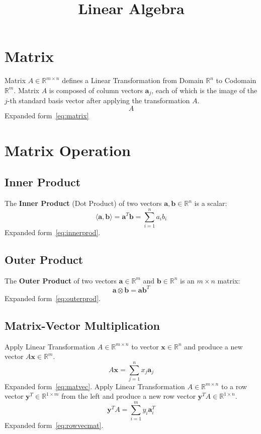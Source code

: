 \documentclass{article}
\title{Linear Algebra}
\date{}
\begin{document}
\maketitle

\tableofcontents

\newpage

\section{Matrix}
Matrix $A \in \mathbb{R}^{m \times n}$ defines a Linear Transformation from Domain $\mathbb{R}^n$ to Codomain $\mathbb{R}^m$.
\newline
Matrix $A$ is composed of column vectors $\mathbf{a}_j$, each of which is the image of the $j$-th standard basis vector after applying the transformation $A$.
\[
    A
\]
Expanded form~\ref{eq:matrix}


\newpage
\section{Matrix Operation}

\subsection{Inner Product}
The \textbf{Inner Product} (Dot Product) of two vectors $\mathbf{a}, \mathbf{b} \in \mathbb{R}^n$ is a scalar:
\[
    \langle \mathbf{a}, \mathbf{b} \rangle = \mathbf{a}^T \mathbf{b} = \sum_{i=1}^n a_i b_i
\]
Expanded form~\ref{eq:innerprod}.

\subsection{Outer Product}
The \textbf{Outer Product} of two vectors $\mathbf{a} \in \mathbb{R}^m$ and $\mathbf{b} \in \mathbb{R}^n$ is an $m \times n$ matrix:
\[
    \mathbf{a} \otimes \mathbf{b} = \mathbf{a} \mathbf{b}^T
\]
Expanded form~\ref{eq:outerprod}.

\subsection{Matrix-Vector Multiplication}
Apply Linear Transformation $A \in \mathbb{R}^{m \times n}$ to vector $\mathbf{x} \in \mathbb{R}^n$ and produce a new vector $A\mathbf{x} \in \mathbb{R}^m$.
\[
    A\mathbf{x} = \sum_{j=1}^n x_j \mathbf{a}_j
\]
Expanded form~\ref{eq:matvec}.
\newline
Apply Linear Transformation $A \in \mathbb{R}^{m \times n}$ to a row vector $\mathbf{y}^T \in \mathbb{R}^{1 \times m}$ from the left and produce a new row vector $\mathbf{y}^T A \in \mathbb{R}^{1 \times n}$.
\[
    \mathbf{y}^T A = \sum_{i=1}^m y_i \mathbf{a}_i^T
\]
Expanded form~\ref{eq:rowvecmat}.
\end{document}
